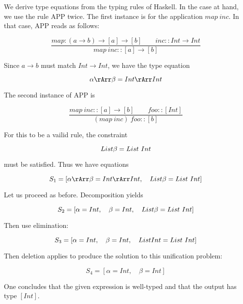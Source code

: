 We derive type equations from the typing rules of Haskell.  In the case at hand, we use the rule APP twice.  The first instance is for the application $map\ inc$.  In that case, APP reads as follows:

\begin{equation}
\frac{map : (a \to b) \to [a] \to [b] \qquad inc :: Int \to Int }{map\ inc :: [a] \to [b]}
\end{equation}

Since $a \to b$ must match $Int \to Int$, we have the type equation

\begin{equation}
\alpha \rArr \beta = Int \rArr Int
\end{equation}

The second instance of APP is 

\begin{equation}
\frac{map\ inc :: [a] \to [b] \qquad foo :: [Int]}{(map\ inc)\ foo :: [b]}
\end{equation}

For this to be a vailid rule, the constraint 

\begin{equation}
List\space \beta = List\ Int
\end{equation}


 must be satisfied.  Thus we have equations

\begin{equation}
S_1 = [\alpha \rArr \beta = Int \rArr Int, \quad List\space \beta = List\ Int]
\end{equation}

Let us proceed as before.  Decomposition yields


\begin{equation}
S_2 = [\alpha = Int, \quad \beta = Int, \quad List\space \beta = List\ Int]
\end{equation}

Then use elimination:

\begin{equation}
S_3 = [\alpha = Int, \quad \beta = Int, \quad List\space Int = List\ Int]
\end{equation}

Then deletion applies to produce the solution to this unification problem:

\begin{equation}
S_4 = [\alpha = Int, \quad \beta = Int]
\end{equation}

One concludes that the given expression is well-typed and that the output has type $[Int]$.

